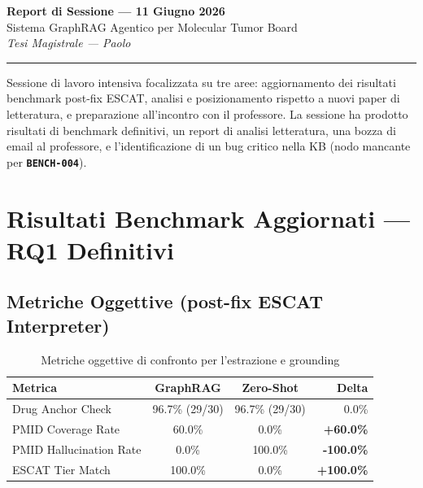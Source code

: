 \documentclass[12pt, a4paper]{article}
\newcommand{\pass}[1]{{\color{passgreen}\textbf{#1}}}
\newcommand{\bench}[1]{{\texttt{\textbf{#1}}}}
\begin{document}
\begin{center}
  {\LARGE\bfseries\color{primaryblue} Report di Sessione --- 11 Giugno 2026}\\[0.4em]
  {\large\color{accentblue} Sistema GraphRAG Agentico per Molecular Tumor Board}\\[0.2em]
  {\small\color{medgray}\textit{Tesi Magistrale --- Paolo}}
\end{center}
\vspace{0.5em}\hrule\vspace{1.2em}

\begin{summarybox}
Sessione di lavoro intensiva focalizzata su tre aree: aggiornamento dei risultati benchmark post-fix ESCAT, analisi e posizionamento rispetto a nuovi paper di letteratura, e preparazione all'incontro con il professore. La sessione ha prodotto risultati di benchmark definitivi, un report di analisi letteratura, una bozza di email al professore, e l'identificazione di un bug critico nella KB (nodo mancante per \bench{BENCH-004}).
\end{summarybox}

\section{Risultati Benchmark Aggiornati --- RQ1 Definitivi}

\subsection{Metriche Oggettive (post-fix ESCAT Interpreter)}

\begin{table}[htbp]
\centering
\small
\renewcommand{\arraystretch}{1.3}
\caption{Metriche oggettive di confronto per l'estrazione e grounding}
\begin{tabularx}{\textwidth}{l c c r}
\toprule
\rowcolor{primaryblue}
\color{white}\textbf{Metrica} & \color{white}\textbf{GraphRAG} & \color{white}\textbf{Zero-Shot} & \color{white}\textbf{Delta} \\
\midrule
Drug Anchor Check & 96.7\% (29/30) & 96.7\% (29/30) & 0.0\% \\
\rowcolor{roweven}
PMID Coverage Rate & 60.0\% & 0.0\% & \pass{+60.0\%} \\
PMID Hallucination Rate & 0.0\% & 100.0\% & \pass{-100.0\%} \\
\rowcolor{roweven}
ESCAT Tier Match & 100.0\% & 0.0\% & \pass{+100.0\%} \\
\bottomrule
\end{tabularx}
\end{table}
\end{document}
